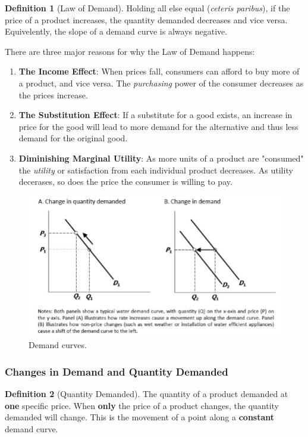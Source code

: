 \documentclass[12pt, a4paper]{article}
\theoremstyle{definition}
\newtheorem{definition}{Definition}
\begin{document}
\begin{definition}[Law of Demand]
    Holding all else equal (\textit{ceteris paribus}), if the price of a product increases, the quantity demanded decreases and vice versa.
    Equivelently, the slope of a demand curve is always negative.
\end{definition}

There are three major reasons for why the Law of Demand happens:
\begin{enumerate}
    \item \textbf{The Income Effect}: When prices fall, consumers can afford to buy more of a product, and vice versa. The \textit{purchasing} power of the consumer decreases as the prices increase.
    \item \textbf{The Substitution Effect}: If a substitute for a good exists, an increase in price for the good will lead to more demand for the alternative and thus less demand for the original good.
    \item \textbf{Diminishing Marginal Utility}: As more units of a product are "consumed" the \textit{utility} or satisfaction from each individual product decreases. As utility decerases, so does the price the consumer is willing to pay.
\end{enumerate}

\begin{figure}[ht] %
    \centering
    \includegraphics[width=1\textwidth]{demand.png}
    \caption{Demand curves.}
    \label{fig:demand}
\end{figure}

\subsubsection{Changes in Demand and Quantity Demanded}
\begin{definition}[Quantity Demanded]
    The quantity of a product demanded at \textbf{one} specific price.
    When \textbf{only} the price of a product changes, the quantity demanded will change.
    This is the movement of a point along a \textbf{constant} demand curve.
\end{definition}
\end{document}
